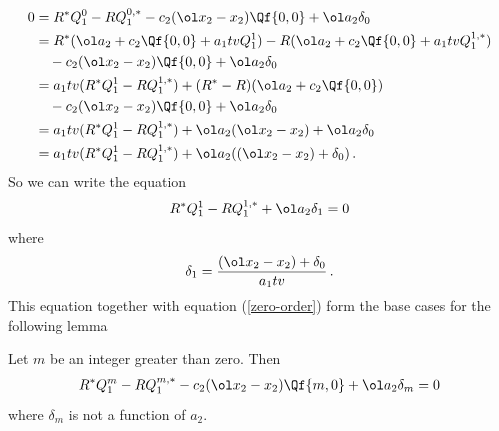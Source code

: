 \begin{align}
\begin{split}
        0 &= R^\ast Q_1^0 -R Q_1^{0,\ast} - c_2(\ol x_2-x_2)\Qf{0,0} + \ol a_2\delta_0 \\
	&= R^\ast (  \ol a_2+c_2\Qf{0,0} + a_1tvQ_1^1) -R ( \ol a_2+c_2\Qf{0,0} + a_1tvQ_1^{1,\ast}) \\
	&\quad- c_2(\ol x_2-x_2)\Qf{0,0} + \ol a_2\delta_0\\
	&=a_1tv(R^\ast Q_1^1-R Q_1^{1,\ast}) + (R^\ast-R)( \ol a_2+c_2\Qf{0,0}) \\
	&\quad- c_2(\ol x_2-x_2)\Qf{0,0} + \ol a_2\delta_0\\
	& =a_1tv(R^\ast Q_1^1-R Q_1^{1,\ast})+ \ol a_2(\ol x_2-x_2)+ \ol a_2\delta_0\\
	& =a_1tv(R^\ast Q_1^1-R Q_1^{1,\ast})+ \ol a_2((\ol x_2-x_2)+\delta_0)\,.
\end{split}
\end{align}
So we can write the equation
\begin{align}
        R^\ast Q_1^1-R Q_1^{1,\ast}+ \ol a_2\delta_1 = 0
\end{align}
where
\begin{align}
   \delta_1 = \frac{(\ol x_2-x_2)+\delta_0}{a_1tv}\,.
\end{align}
This equation together with equation (\ref{zero-order}) form the base cases for the following lemma
\begin{lemma} Let $m$ be an integer greater than zero. Then
\begin{align}\label{coeff-eqn}
	R^\ast Q_1^m -R Q_1^{m,\ast} - c_2(\ol x_2-x_2)\Qf{m,0} + \ol a_2\delta_m = 0
\end{align}
where $\delta_m$ is not a function of $a_2$.
\end{lemma}
